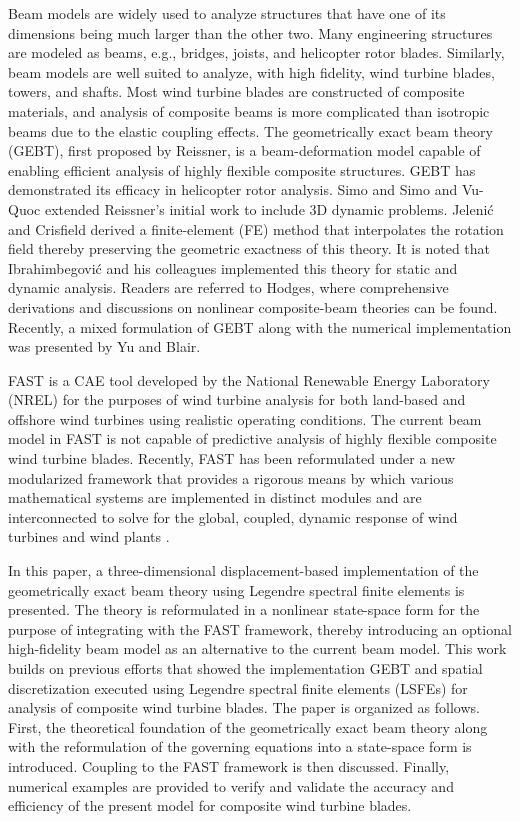 \documentclass{aiaa-tc}
\begin{document}
Beam models are widely used to analyze structures that have one of its
dimensions being much larger than the other two.  Many engineering
structures are modeled as beams, e.g.,  bridges, joists, and helicopter
rotor blades.  Similarly, beam models are well suited to analyze, with high
fidelity,  wind turbine blades, towers, and shafts.  Most wind turbine
blades are constructed of composite materials, and analysis of composite
beams is more complicated than isotropic beams due to the elastic coupling
effects.  The geometrically exact beam theory (GEBT), first proposed by
Reissner\cite{Ressiner1973}, is a beam-deformation model capable of
enabling efficient analysis of highly flexible composite structures.
GEBT has demonstrated its efficacy in helicopter rotor analysis.
Simo\cite{Simo1985} and Simo and Vu-Quoc\cite{Simo1986} extended Reissner's
initial work to include 3D dynamic problems. Jeleni\'c and
Crisfield\cite{Crisfield1999} derived a finite-element (FE) method that
interpolates the rotation field thereby preserving the geometric exactness
of this theory. It is noted that Ibrahimbegovi\'c and his colleagues
implemented this theory for static\cite{Ibrahim1995} and
dynamic\cite{Ibrahim1998} analysis. Readers are referred to
Hodges\cite{HodgesBeamBook}, where comprehensive derivations and discussions
on nonlinear composite-beam theories can be found. Recently, a mixed
formulation of GEBT along with the numerical implementation was presented by
Yu and Blair\cite{YuGEBT}.  

FAST is a CAE tool developed by the National Renewable Energy Laboratory
(NREL) for the purposes of wind turbine analysis for both land-based and
offshore wind turbines using realistic operating conditions.  The current
beam model in FAST is not capable of predictive analysis of highly flexible
composite wind turbine blades.
Recently, FAST has been reformulated under a
new modularized framework that provides a rigorous means by which various
mathematical systems are implemented in distinct modules and are interconnected
to solve for the global, coupled, dynamic response of wind turbines and wind
plants \cite{Jonkman:2013,website:FASTModularizationFramework}.

In this paper, a three-dimensional displacement-based
implementation of the geometrically exact beam theory using Legendre
spectral finite elements is presented. The theory is reformulated in a
nonlinear state-space form for the purpose of integrating with the FAST
framework, thereby introducing an optional high-fidelity beam model as an
alternative to the current beam model. This work builds on previous efforts
that showed the implementation GEBT and spatial discretization executed
using Legendre spectral finite elements
(LSFEs)\cite{Wang:GEBT2013,Wang:SFE2013,Wang:GEBT2014,Sprague:FAST2014} for
analysis of composite wind turbine blades. The paper is organized as
follows.  First, the theoretical foundation of the geometrically exact beam
theory along with the reformulation of the governing equations into a
state-space form is introduced. Coupling to the FAST framework is then
discussed. Finally, numerical examples are
provided to verify and validate the accuracy and efficiency of the present model for
composite wind turbine blades. 
\end{document}
